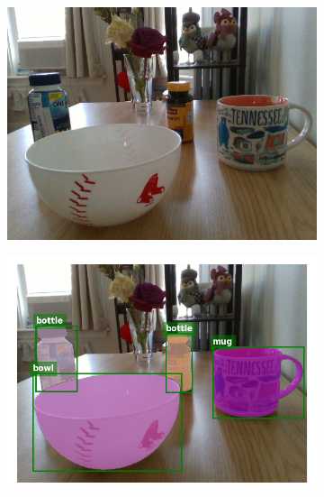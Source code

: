 \documentclass{article}
\begin{document}
\begin{figure}[]
    \begin{subfigure}{(\linewidth - 0.05\linewidth)/5}
        \centering
        \includegraphics[width=\linewidth]{figures/real2sim2real/5/1.png}
        \caption{}
    \end{subfigure}
    \begin{subfigure}{(\linewidth - 0.05\linewidth)/5}
        \centering
        \includegraphics[width=\linewidth]{figures/real2sim2real/5/0.png}
        \caption{}
    \end{subfigure}
    \begin{subfigure}{(\linewidth - 0.05\linewidth)/5}
        \centering

\end{subfigure}
\end{figure}
\end{document}
